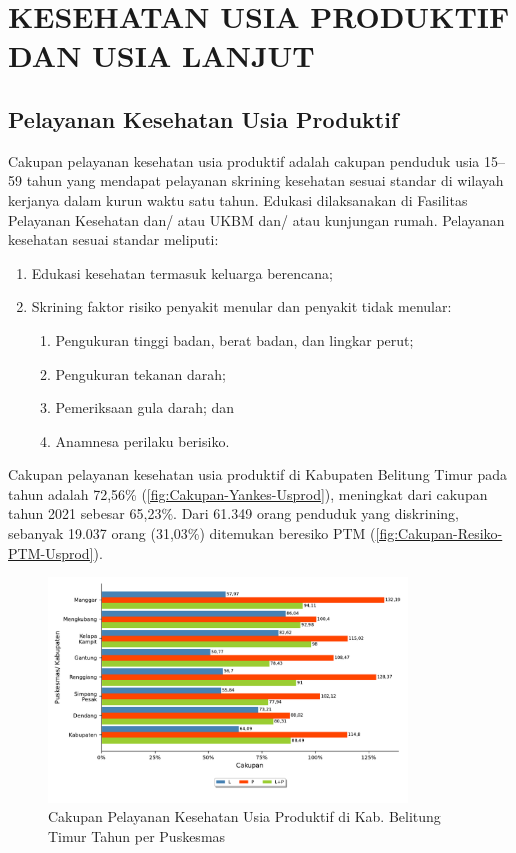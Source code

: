 \section[USIPRO DAN USILA]{KESEHATAN USIA PRODUKTIF DAN USIA LANJUT}
\subsection{Pelayanan Kesehatan Usia Produktif}
Cakupan pelayanan kesehatan usia produktif adalah cakupan penduduk usia 15–59 tahun yang mendapat pelayanan skrining kesehatan sesuai standar di wilayah kerjanya dalam kurun waktu satu tahun. Edukasi dilaksanakan di Fasilitas Pelayanan Kesehatan dan/ atau UKBM dan/ atau kunjungan rumah. Pelayanan kesehatan sesuai standar meliputi:
\begin{enumerate}
  \item Edukasi kesehatan termasuk keluarga berencana;
  \item Skrining faktor risiko penyakit menular dan penyakit tidak menular:
  \begin{enumerate}
    \item Pengukuran tinggi badan, berat badan, dan lingkar perut;
    \item Pengukuran tekanan darah;
    \item Pemeriksaan gula darah; dan
    \item Anamnesa perilaku berisiko.
  \end{enumerate}
\end{enumerate}

Cakupan pelayanan kesehatan usia produktif di Kabupaten Belitung Timur pada tahun \tP adalah 72,56\% (\autoref{fig:Cakupan-Yankes-Usprod}), meningkat dari cakupan tahun 2021 sebesar 65,23\%.
Dari 61.349 orang penduduk yang diskrining, sebanyak 19.037 orang (31,03\%) ditemukan beresiko PTM (\autoref{fig:Cakupan-Resiko-PTM-Usprod}).

\begin{figure}[H]
    \centering
    \includegraphics[width=0.85\textwidth]{bab_05/bab_05_28_skriningProduktif_a}
    \caption{Cakupan Pelayanan Kesehatan Usia Produktif di Kab. Belitung Timur Tahun \tP per Puskesmas}
    \label{fig:Cakupan-Yankes-Usprod}
\end{figure}


